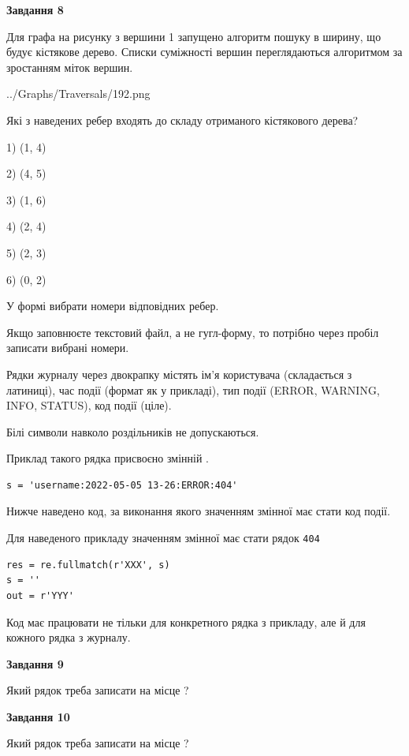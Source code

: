 \documentclass[12pt, ukrainian]{article}
\def\code#1{\Verb!#1!}
\begin{document}
{\begin {large}
{\begin {center}\textbf{Завдання 8}\end {center}}\par
Для графа на рисунку з вершини 1 запущено алгоритм пошуку в ширину, що будує кістякове дерево. Списки суміжності вершин переглядаються алгоритмом за зростанням міток вершин.\par
\begin{center}
	{../Graphs/Traversals/192.png}
\end{center}
\par Які з наведених ребер входять до складу отриманого кістякового дерева?\par
1) (1, 4)\par
2) (4, 5)\par
3) (1, 6)\par
4) (2, 4)\par
5) (2, 3)\par
6) (0, 2)\par
{\vskip 15pt} У формі вибрати номери відповідних ребер.


Якщо заповнюєте текстовий файл, а не гугл-форму, то потрібно через пробіл записа\-ти вибрані номери.\par
\newpage


Рядки журналу через двокрапку містять ім'я користувача (складається з латиниці), час події (фор\-мат як у прикладі), тип події (ERROR, WARNING, INFO, STATUS), код події (ціле).

Білі символи навколо роздільників не допускаються.

Приклад такого рядка присвоєно змінній .



\begin{verbatim}
s = 'username:2022-05-05 13-26:ERROR:404'
\end{verbatim}


Нижче наведено код, за виконання якого значенням змінної  має стати код події.

Для наведеного прикладу значенням змінної  має стати рядок \code{404}



\begin{verbatim}
res = re.fullmatch(r'XXX', s)
s = ''
out = r'YYY'
\end{verbatim}


Код має працювати не тільки для конкретного рядка з прикладу, але й для кожного рядка з журналу.

{\begin {center}\textbf{Завдання 9}\end {center}}\par
Який рядок треба записати на місце  ?\par
\vspace{5mm}


{\begin {center}\textbf{Завдання 10}\end {center}}\par
Який рядок треба записати на місце  ?\par


\newpage


\end {large}}
\end{document}
